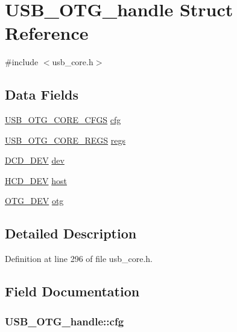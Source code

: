 \hypertarget{struct_u_s_b___o_t_g__handle}{\section{U\-S\-B\-\_\-\-O\-T\-G\-\_\-handle Struct Reference}
\label{struct_u_s_b___o_t_g__handle}
}


{\ttfamily \#include $<$usb\-\_\-core.\-h$>$}

\subsection*{Data Fields}
\begin{DoxyCompactItemize}
\item 
\hyperlink{group___u_s_b___c_o_r_e___exported___types_ga76fe5e2e503de333886f75f641935563}{U\-S\-B\-\_\-\-O\-T\-G\-\_\-\-C\-O\-R\-E\-\_\-\-C\-F\-G\-S} \hyperlink{struct_u_s_b___o_t_g__handle_a37ab14e0f74230d4e4ebe64815bdb350}{cfg}
\item 
\hyperlink{group______otg___core__registers_gaec970ace8b42f73987f30d48b013febf}{U\-S\-B\-\_\-\-O\-T\-G\-\_\-\-C\-O\-R\-E\-\_\-\-R\-E\-G\-S} \hyperlink{struct_u_s_b___o_t_g__handle_af38a2c60078ebd520cfb3fe2303f1adb}{regs}
\item 
\hyperlink{group___u_s_b___c_o_r_e___exported___types_gafdc88fd6bbf73ffac31887ff9a4c6f8e}{D\-C\-D\-\_\-\-D\-E\-V} \hyperlink{struct_u_s_b___o_t_g__handle_a43c46832b8382a492bfb8cbf49a65103}{dev}
\item 
\hyperlink{group___u_s_b___c_o_r_e___exported___types_ga6efd576081986011501261979c241f23}{H\-C\-D\-\_\-\-D\-E\-V} \hyperlink{struct_u_s_b___o_t_g__handle_a250de20433d4a359a8257c7687bba06a}{host}
\item 
\hyperlink{group___u_s_b___c_o_r_e___exported___types_ga54d11d7473e6091a9fef51d51d55c8f2}{O\-T\-G\-\_\-\-D\-E\-V} \hyperlink{struct_u_s_b___o_t_g__handle_a9391e8d9ccfd6844985c8abb0ed7f2fd}{otg}
\end{DoxyCompactItemize}


\subsection{Detailed Description}


Definition at line 296 of file usb\-\_\-core.\-h.



\subsection{Field Documentation}
\hypertarget{struct_u_s_b___o_t_g__handle_a37ab14e0f74230d4e4ebe64815bdb350}{
\subsubsection[{cfg}]{ U\-S\-B\-\_\-\-O\-T\-G\-\_\-handle\-::cfg}}\label{struct_u_s_b___o_t_g__handle_a37ab14e0f74230d4e4ebe64815bdb350}


